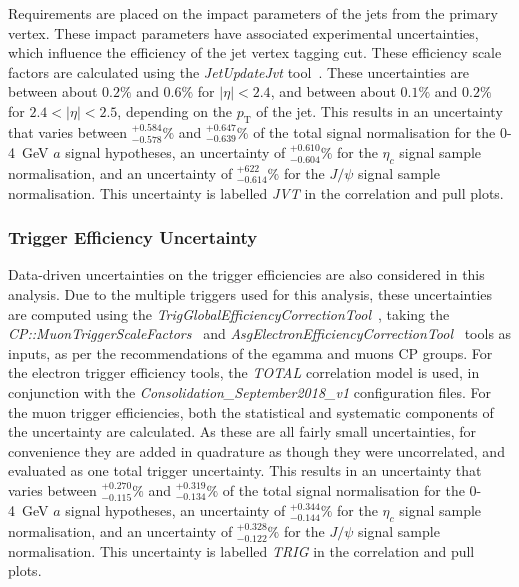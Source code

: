 \documentclass[NOTE, atlasdraft=true, texlive=2017, UKenglish]{\ATLASLATEXPATH atlasdoc}
\begin{document}
Requirements are placed on the impact parameters of the jets from the primary vertex. These impact parameters have associated experimental uncertainties, which influence the efficiency of the jet vertex tagging cut. These efficiency scale factors are calculated using the \emph{JetUpdateJvt} tool~\cite{JetUpdateJvt}. These uncertainties are between about $0.2\%$ and $0.6\%$ for $\vert\eta\vert<2.4$, and between about $0.1\%$ and $0.2\%$ for $2.4<\vert\eta\vert<2.5$, depending on the $p_\text{T}$ of the jet. This results in an uncertainty that varies between $^{+0.584}_{-0.578}\%$ and $^{+0.647}_{-0.639}\%$ of the total signal normalisation for the 0-4~GeV $a$ signal hypotheses, an uncertainty of $^{+0.610}_{-0.604}\%$ for the $\eta_c$ signal sample normalisation, and an uncertainty of $^{+622}_{-0.614}\%$ for the $J/\psi$ signal sample normalisation. This uncertainty is labelled \emph{JVT} in the correlation and pull plots.


\subsubsection{Trigger Efficiency Uncertainty}
\label{sec:systrig}

Data-driven uncertainties on the trigger efficiencies are also considered in this analysis. Due to the multiple triggers used for this analysis, these uncertainties are computed using the \emph{TrigGlobalEfficiencyCorrectionTool}~\cite{TrigGlobalEfficiencyCorrectionTool}, taking the \emph{CP::MuonTriggerScaleFactors}~\cite{MuonTriggerScaleFactors} and \emph{AsgElectronEfficiencyCorrectionTool}~\cite{AsgElectronEfficiencyCorrectionTool} tools as inputs, as per the recommendations of the egamma and muons CP groups. For the electron trigger efficiency tools, the \emph{TOTAL} correlation model is used, in conjunction with the \emph{Consolidation\_September2018\_v1} configuration files. For the muon trigger efficiencies, both the statistical and systematic components of the uncertainty are calculated. As these are all fairly small uncertainties, for convenience they are added in quadrature as though they were uncorrelated, and evaluated as one total trigger uncertainty. This results in an uncertainty that varies between $^{+0.270}_{-0.115}\%$ and $^{+0.319}_{-0.134}\%$ of the total signal normalisation for the 0-4~GeV $a$ signal hypotheses, an uncertainty of $^{+0.344}_{-0.144}\%$ for the $\eta_c$ signal sample normalisation, and an uncertainty of $^{+0.328}_{-0.122}\%$ for the $J/\psi$ signal sample normalisation. This uncertainty is labelled \emph{TRIG} in the correlation and pull plots.%
\end{document}
